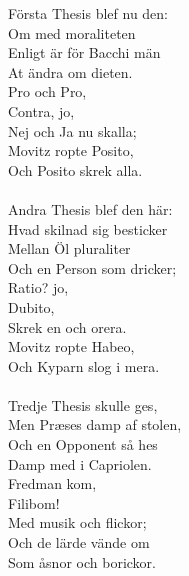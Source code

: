 Första Thesis blef nu den:\\
Om med moraliteten\\
Enligt är för Bacchi män\\
At ändra om dieten.\\
	Pro och Pro,\\
	Contra, jo,\\
	Nej och Ja nu skalla;\\
Movitz ropte Posito,\\
Och Posito skrek alla.\\
\\
Andra Thesis blef den här:\\
Hvad skilnad sig besticker\\
Mellan Öl pluraliter\\
Och en Person som dricker;\\
	Ratio? jo,\\
	Dubito,\\
	Skrek en och orera.\\
Movitz ropte Habeo,\\
Och Kyparn slog i mera.\\
\\
Tredje Thesis skulle ges,\\
Men Præses damp af stolen,\\
Och en Opponent så hes\\
Damp med i Capriolen.\\ 
	Fredman kom,\\
	Filibom!\\
	Med musik och flickor;\\
Och de lärde vände om\\
Som åsnor och borickor.
